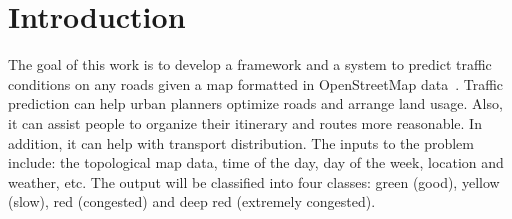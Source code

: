 \section{Introduction}
\label{sec:intro}


The goal of this work is to develop a framework and a system to 
predict traffic conditions on any roads given a map formatted in 
OpenStreetMap data~\cite{openstreetmap}. 
Traffic prediction can help urban planners optimize roads and arrange land usage. Also, it can assist people to organize their itinerary and routes more reasonable. In addition, it can help with transport distribution. The inputs to the problem include: 
the topological map data, time of the day, day of the week, 
location and weather, etc. The output will be classified 
into four classes: green (good), yellow (slow), red (congested) 
and deep red (extremely congested). 

